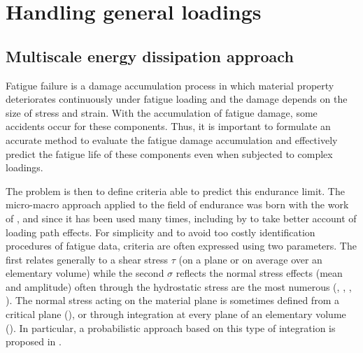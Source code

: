 \chapter{Handling general loadings}\label{chp:5}
\minitoc

\section{Multiscale energy dissipation approach}
\label{sec:5.1}
Fatigue failure is a damage accumulation process in which material property deteriorates continuously under fatigue loading and the damage depends on the size of stress and strain. With the accumulation of fatigue damage, some accidents occur for these components. Thus, it is important to formulate an accurate method to evaluate the fatigue damage accumulation and effectively predict the fatigue life of these components even when subjected to complex loadings.

The problem is then to define criteria able to predict this endurance limit. The micro-macro approach applied to the field of endurance was born with the work of \cite{van1973khmu}, and since it has been used many times, including by \cite{papadopoulos2001long} to take better account of loading path effects. For simplicity and to avoid too costly identification procedures of fatigue data, criteria are often expressed using two parameters. The first relates generally to a shear stress $\tau$ (on a plane or on average over an elementary volume) while the second $\sigma$ reflects the normal stress effects (mean and amplitude) often through the hydrostatic stress are the most numerous (\cite{crossland1956effect}, \cite{sines1959behavior}, \cite{FFE:FFE452}, \cite{thu2008effet}).  The normal stress acting on the material plane is sometimes defined from a critical plane (\cite{findley1959}), or through integration at every plane of an elementary volume (\cite{liu1993berechnung}).  In particular, a probabilistic approach based on this type of integration is proposed in \cite{thu2008effet} .

